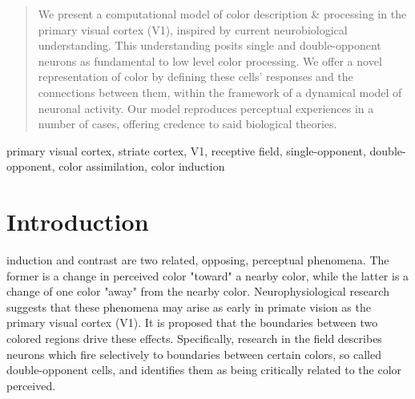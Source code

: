 \documentclass[journal,onecolumn]{IEEEtran}
\begin{document}
\begin{abstract}
We present a computational model of color description \& processing in the primary visual cortex (V1), inspired by current neurobiological understanding. This understanding posits single and double-opponent neurons as fundamental to low level color processing. We offer a novel representation of color by defining these cells' responses and the connections between them, within the framework of a dynamical model of neuronal activity. Our model reproduces perceptual experiences in a number of cases, offering credence to said biological theories.
\end{abstract}

\begin{IEEEkeywords}
primary visual cortex, striate cortex, V1, receptive field, single-opponent, double-opponent, color assimilation, color induction
\end{IEEEkeywords}


%
\IEEEpeerreviewmaketitle



\section{Introduction}


 induction and contrast are two related, opposing, perceptual phenomena. The former is a change in perceived color "toward" a nearby color, while the latter is a change of one color "away" from the nearby color. Neurophysiological research suggests that these phenomena may arise as early in primate vision as the primary visual cortex (V1). It is proposed that the boundaries between two colored regions drive these effects. Specifically, research in the field describes neurons which fire selectively to boundaries between certain colors, so called double-opponent cells, and identifies them as being critically related to the color perceived.
\end{document}
